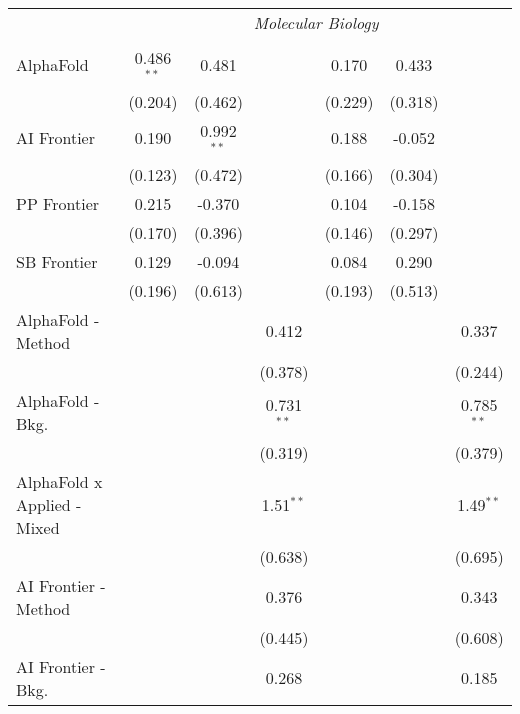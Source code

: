 \begin{tabular}{lcccccc}
 & \multicolumn{6}{c}{\textit{Molecular Biology}} \\ \\
   AlphaFold                     & 0.486$^{**}$ & 0.481        &                & 0.170   & 0.433   &   \\   
                                 & (0.204)      & (0.462)      &                & (0.229) & (0.318) &   \\   
   AI Frontier                   & 0.190        & 0.992$^{**}$ &                & 0.188   & -0.052  &   \\   
                                 & (0.123)      & (0.472)      &                & (0.166) & (0.304) &   \\   
   PP Frontier                   & 0.215        & -0.370       &                & 0.104   & -0.158  &   \\   
                                 & (0.170)      & (0.396)      &                & (0.146) & (0.297) &   \\   
   SB Frontier                   & 0.129        & -0.094       &                & 0.084   & 0.290   &   \\   
                                 & (0.196)      & (0.613)      &                & (0.193) & (0.513) &   \\   
   AlphaFold - Method            &              &              & 0.412          &         &         & 0.337\\   
                                 &              &              & (0.378)        &         &         & (0.244)\\   
   AlphaFold - Bkg.              &              &              & 0.731$^{**}$   &         &         & 0.785$^{**}$\\   
                                 &              &              & (0.319)        &         &         & (0.379)\\   
   AlphaFold x Applied - Mixed   &              &              & 1.51$^{**}$    &         &         & 1.49$^{**}$\\   
                                 &              &              & (0.638)        &         &         & (0.695)\\   
   AI Frontier - Method          &              &              & 0.376          &         &         & 0.343\\   
                                 &              &              & (0.445)        &         &         & (0.608)\\   
   AI Frontier - Bkg.            &              &              & 0.268          &         &         & 0.185\\   

\end{tabular}
